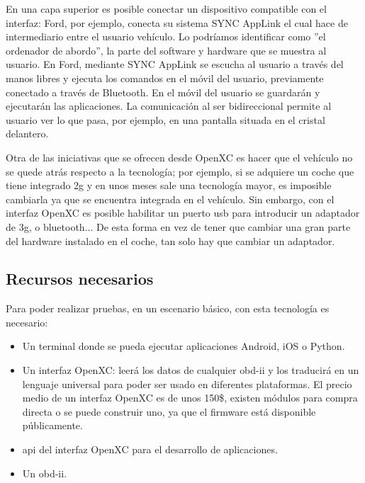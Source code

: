En una capa superior es posible conectar un dispositivo compatible con el
interfaz: Ford, por ejemplo, conecta su sistema SYNC AppLink el cual hace de
intermediario entre el usuario vehículo. Lo podríamos identificar como ''el
ordenador de abordo'', la parte del software y hardware que se muestra al
usuario. En Ford, mediante SYNC AppLink se escucha al usuario a través del manos
libres y ejecuta los comandos en el móvil del usuario, previamente conectado a
través de Bluetooth. En el móvil del usuario se guardarán y ejecutarán las
aplicaciones. La comunicación al ser bidireccional permite al usuario ver lo
que pasa, por ejemplo, en una pantalla situada en el cristal delantero.

Otra de las iniciativas que se ofrecen desde OpenXC es hacer que el vehículo no
se quede atrás respecto a la tecnología; por ejemplo, si se adquiere un coche
que tiene integrado \gls{2g} y en unos meses sale una tecnología mayor, es
imposible cambiarla ya que se encuentra integrada en el vehículo. Sin embargo,
con el interfaz OpenXC es posible habilitar un puerto \gls{usb} para introducir
un adaptador de \gls{3g}, o bluetooth... De esta forma en vez de tener que
cambiar una gran parte del hardware instalado en el coche, tan solo hay que
cambiar un adaptador.

\subsection{Recursos necesarios}
Para poder realizar pruebas, en un escenario básico, con esta tecnología es
necesario:

\begin{itemize}
	\item Un terminal donde se pueda ejecutar aplicaciones Android, iOS o Python.

	\item Un interfaz OpenXC: leerá los datos de cualquier \Gls{obd-ii} y los
	traducirá en un lenguaje universal para poder ser usado en diferentes
	plataformas. El precio medio de un interfaz OpenXC es de unos 150\$, existen
	módulos para compra directa o se puede construir uno, ya que el firmware está
	disponible públicamente.

	\item \gls{api} del interfaz OpenXC para el desarrollo de aplicaciones.

	\item Un \Gls{obd-ii}.
\end{itemize}
